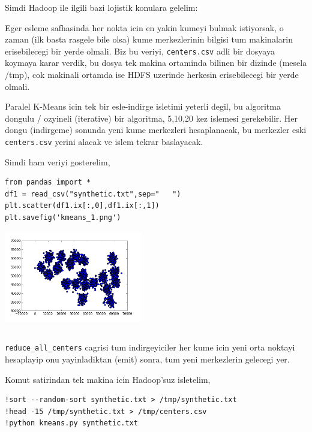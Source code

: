 \documentclass[12pt,fleqn]{article}\usepackage{../common}
\begin{document}
Simdi Hadoop ile ilgili bazi lojistik konulara gelelim:

Eger esleme safhasinda her nokta icin en yakin kumeyi bulmak
istiyorsak, o zaman (ilk basta rasgele bile olsa) kume merkezlerinin
bilgisi tum makinalarin erisebilecegi bir yerde olmali. Biz bu veriyi,
\verb!centers.csv! adli bir dosyaya koymaya karar verdik, bu dosya
tek makina ortaminda bilinen bir dizinde (mesela /tmp), cok makinali ortamda
ise HDFS uzerinde herkesin erisebilecegi bir yerde olmali. 

Paralel K-Means icin tek bir esle-indirge isletimi yeterli degil, bu
algoritma dongulu / ozyineli (iterative) bir algoritma, 5,10,20 kez
islemesi gerekebilir.  Her dongu (indirgeme) sonunda yeni kume
merkezleri hesaplanacak, bu merkezler eski \verb!centers.csv!
yerini alacak ve islem tekrar baslayacak.

Simdi ham veriyi gosterelim,

\begin{verbatim}
from pandas import *
df1 = read_csv("synthetic.txt",sep="   ")
plt.scatter(df1.ix[:,0],df1.ix[:,1])
plt.savefig('kmeans_1.png')
\end{verbatim}

\includegraphics[height=4cm]{kmeans_1.png}

\inputminted{python}{kmeans.py}

\verb!reduce_all_centers! cagrisi tum indirgeyiciler her kume icin yeni
orta noktayi hesaplayip onu yayinladiktan (emit) sonra, tum yeni
merkezlerin gelecegi yer.

Komut satirindan tek makina icin Hadoop'suz isletelim,

\begin{verbatim}
!sort --random-sort synthetic.txt > /tmp/synthetic.txt
!head -15 /tmp/synthetic.txt > /tmp/centers.csv
!python kmeans.py synthetic.txt
\end{verbatim}
\end{document}
